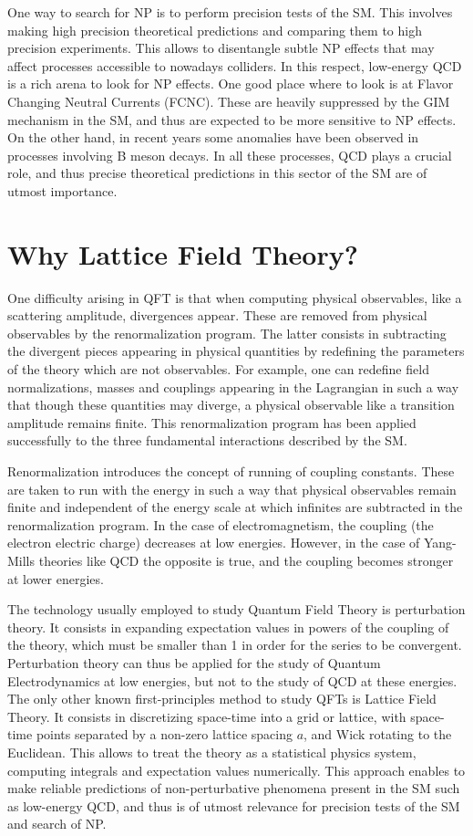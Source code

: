 One way to search for NP is to perform precision tests of the SM. This involves making high precision theoretical predictions and comparing them to high precision experiments. This allows to disentangle subtle NP effects that may affect processes accessible to nowadays colliders. In this respect, low-energy QCD is a rich arena to look for NP effects. One good place where to look is at Flavor Changing Neutral Currents (FCNC). These are heavily suppressed by the GIM mechanism in the SM, and thus are expected to be more sensitive to NP effects. On the other hand, in recent years some anomalies have been observed in processes involving B meson decays. In all these processes, QCD plays a crucial role, and thus precise theoretical predictions in this sector of the SM are of utmost importance.

\section*{Why Lattice Field Theory?}

One difficulty arising in QFT is that when computing physical observables, like a scattering amplitude, divergences appear. These are removed from physical observables by the renormalization program. The latter consists in subtracting the divergent pieces appearing in physical quantities by redefining the parameters of the theory which are not observables. For example, one can redefine field normalizations, masses and couplings appearing in the Lagrangian in such a way that though these quantities may diverge, a physical observable like a transition amplitude remains finite. This renormalization program has been applied successfully to the three fundamental interactions described by the SM.

Renormalization introduces the concept of running of coupling constants. These are taken to run with the energy in such a way that physical observables remain finite and independent of the energy scale at which infinites are subtracted in the renormalization program.  In the case of electromagnetism, the coupling (the electron electric charge) decreases at low energies. However, in the case of Yang-Mills theories like QCD the opposite is true, and the coupling becomes stronger at lower energies.

The technology usually employed to study Quantum Field Theory is perturbation theory. It consists in expanding expectation values in powers of the coupling of the theory, which must be smaller than 1 in order for the series to be convergent. Perturbation theory can thus be applied for the study of Quantum Electrodynamics at low energies, but not to the study of QCD at these energies. The only other known first-principles method to study QFTs is Lattice Field Theory. It consists in discretizing space-time into a grid or lattice, with space-time points separated by a non-zero lattice spacing $a$, and Wick rotating to the Euclidean. This allows to treat the theory as a statistical physics system, computing integrals and expectation values numerically. This approach enables to make reliable predictions of non-perturbative phenomena present in the SM such as low-energy QCD, and thus is of utmost relevance for precision tests of the SM and search of NP. 

